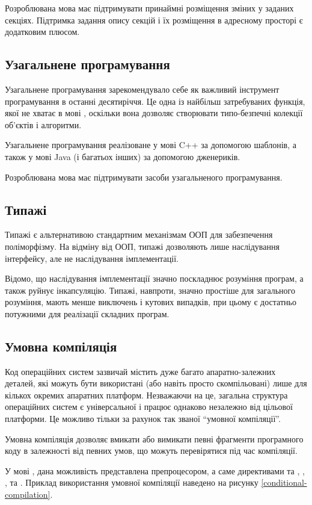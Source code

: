 \documentclass[main.tex]{subfiles}
\begin{document}
Розроблювана мова має підтримувати принаймні розміщення зміних у заданих секціях. Підтримка задання опису секцій і їх розміщення в адресному просторі є додатковим плюсом.

\subsection{Узагальнене програмування}
Узагальнене програмування зарекомендувало себе як важливий інструмент програмування в останні десятиріччя. Це одна із найбільш затребуваних функція, якої не хватає в мові \LangC{}, оскільки вона дозволяє створювати типо-безпечні колекції об'єктів і алгоритми.

Узагальнене програмування реалізоване у мові C++ за допомогою шаблонів, а також у мові Java (і багатьох інших) за допомогою дженериків.

Розроблювана мова має підтримувати засоби узагальненого програмування.

\subsection{Типажі}
Типажі є альтернативою стандартним механізмам ООП для забезпечення поліморфізму. На відміну від ООП, типажі дозволяють лише наслідування інтерфейсу, але не наслідування імплементації.

Відомо, що наслідування імплементації значно поскладнює розуміння програм, а також руйнує інкапсуляцію\cite{oop-must-die}.
Типажі, навпроти, значно простіше для загального розуміння, мають менше виключень і кутових випадків, при цьому є достатньо потужними для реалізації складних програм.

\subsection{Умовна компіляція}
Код операційних систем зазвичай містить дуже багато апаратно-залежних деталей, які можуть бути використані (або навіть просто скомпільовані) лише для кількох окремих апаратних платформ.
Незважаючи на це, загальна структура операційних систем є універсальної і працює однаково незалежно від цільової платформи.
Це можливо тільки за рахунок так званої ``умовної компіляції''.

Умовна компіляція дозволяє вмикати або вимикати певні фрагменти програмного коду в залежності від певних умов, що можуть перевірятися під час компіляції.

У мові \LangC{}, дана можливість представлена препроцесором, а саме директивами  та , , ,  та . Приклад використання умовної компіляції наведено на рисунку \ref{conditional-compilation}.
\end{document}
